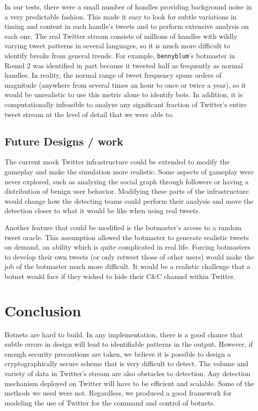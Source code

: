 \documentclass[11pt, oneside]{article} %
\numberwithin{equation}{section} %
\numberwithin{figure}{section} %
\numberwithin{table}{section} %
\renewcommand{\c}[1]{\texttt{#1}}
\newcommand{\teambb}{\c{bennyblum}}
\begin{document}
In our tests, there were a small number of handles providing background noise in a very predictable fashion. This made it easy to look for subtle variations in timing and content in each handle's tweets and to perform extensive analysis on each one. The real Twitter stream consists of millions of handles with wildly varying tweet patterns in several languages, so it is much more difficult to identify breaks from general trends. For example, \teambb{}'s botmaster in Round 2 was identified in part because it tweeted half as frequently as normal handles. In reality, the normal range of tweet frequency spans orders of magnitude (anywhere from several times an hour to once or twice a year), so it would be unrealistic to use this metric alone to identify bots. In addition, it is computationally infeasible to analyze any significant fraction of Twitter's entire tweet stream at the level of detail that we were able to.
        
        \subsection{Future Designs / work}

        The current mock Twitter infrastructure could be extended to modify the gameplay and make the simulation more realistic. Some aspects of gameplay were never explored, such as analyzing the social graph through followers or having a distribution of benign user behavior. Modifying these parts of the infrastructure would change how the detecting teams could perform their analysis and move the detection closer to what it would be like when using real tweets.

		Another feature that could be modified is the botmaster's access to a random tweet oracle. This assumption allowed the botmaster to generate realistic tweets on demand, an ability which is quite complicated in real life. Forcing botmasters to develop their own tweets (or only retweet those of other users) would make the job of the botmaster much more difficult. It would be a realistic challenge that a botnet would face if they wished to hide their C\&C channel within Twitter.

\section{Conclusion}
     	Botnets are hard to build. In any implementation, there is a good chance that subtle errors in design will lead to identifiable patterns in the output. However, if enough security precautions are taken, we believe it is possible to design a cryptographically secure scheme that is very difficult to detect. The volume and variety of data in Twitter's stream are also obstacles to detection. Any detection mechanism deployed on Twitter will have to be efficient and scalable. Some of the methods we used were not. Regardless, we produced a good framework for modeling the use of Twitter for the command and control of botnets.

        

\clearpage
\renewcommand\bibsection{\section{References}}
\renewcommand*{\bibfont}{\footnotesize}
\setlength\bibsep{3pt}


\end{document}
